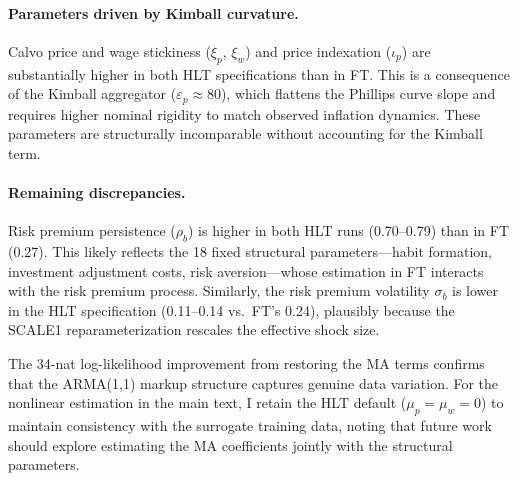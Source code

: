 \documentclass[12pt]{article}
\theoremstyle{plain}
\theoremstyle{definition}
\theoremstyle{remark}
\begin{document}
\paragraph{Parameters driven by Kimball curvature.} Calvo price and wage stickiness ($\xi_p$, $\xi_w$) and price indexation ($\iota_p$) are substantially higher in both HLT specifications than in FT. This is a consequence of the Kimball aggregator ($\varepsilon_p \approx 80$), which flattens the Phillips curve slope and requires higher nominal rigidity to match observed inflation dynamics. These parameters are structurally incomparable without accounting for the Kimball term.

\paragraph{Remaining discrepancies.} Risk premium persistence ($\rho_b$) is higher in both HLT runs (0.70--0.79) than in FT (0.27). This likely reflects the 18 fixed structural parameters---habit formation, investment adjustment costs, risk aversion---whose estimation in FT interacts with the risk premium process. Similarly, the risk premium volatility $\sigma_b$ is lower in the HLT specification (0.11--0.14 vs.\ FT's 0.24), plausibly because the SCALE1 reparameterization rescales the effective shock size.

The 34-nat log-likelihood improvement from restoring the MA terms confirms that the ARMA(1,1) markup structure captures genuine data variation. For the nonlinear estimation in the main text, I retain the HLT default ($\mu_p = \mu_w = 0$) to maintain consistency with the surrogate training data, noting that future work should explore estimating the MA coefficients jointly with the structural parameters.


\clearpage
\end{document}
